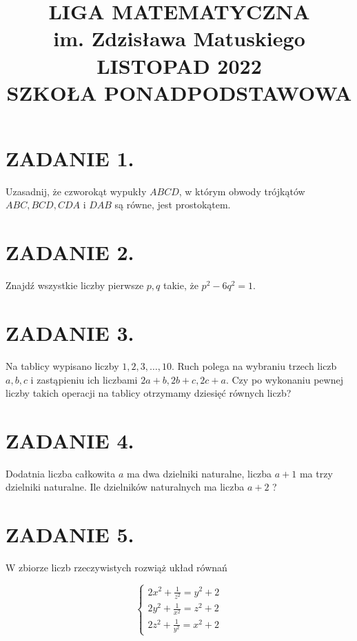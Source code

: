 \documentclass[10pt]{article}
\title{LIGA MATEMATYCZNA \\
 im. Zdzisława Matuskiego \\
 LISTOPAD 2022 \\
 SZKOŁA PONADPODSTAWOWA }
\author{}
\date{}
\begin{document}
\maketitle
\section*{ZADANIE 1.}
Uzasadnij, że czworokąt wypukły \(A B C D\), w którym obwody trójkątów \(A B C, B C D, C D A\) i \(D A B\) są równe, jest prostokątem.

\section*{ZADANIE 2.}
Znajdź wszystkie liczby pierwsze \(p, q\) takie, że \(p^{2}-6 q^{2}=1\).

\section*{ZADANIE 3.}
Na tablicy wypisano liczby \(1,2,3, \ldots, 10\). Ruch polega na wybraniu trzech liczb \(a, b, c\) i zastąpieniu ich liczbami \(2 a+b, 2 b+c, 2 c+a\). Czy po wykonaniu pewnej liczby takich operacji na tablicy otrzymamy dziesięć równych liczb?

\section*{ZADANIE 4.}
Dodatnia liczba całkowita \(a\) ma dwa dzielniki naturalne, liczba \(a+1\) ma trzy dzielniki naturalne. Ile dzielników naturalnych ma liczba \(a+2\) ?

\section*{ZADANIE 5.}
W zbiorze liczb rzeczywistych rozwiąż układ równań

\[
\left\{\begin{array}{l}
2 x^{2}+\frac{1}{z^{2}}=y^{2}+2 \\
2 y^{2}+\frac{1}{x^{2}}=z^{2}+2 \\
2 z^{2}+\frac{1}{y^{2}}=x^{2}+2
\end{array}\right.
\]
\end{document}
